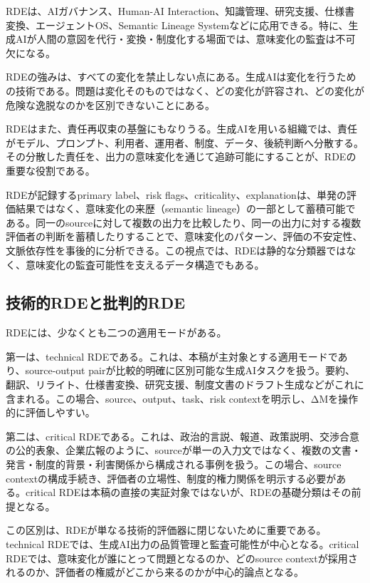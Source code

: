 \documentclass[
  a4paper]{ltjsarticle}
\begin{document}
RDEは、AIガバナンス、Human-AI
Interaction、知識管理、研究支援、仕様書変換、エージェントOS、Semantic
Lineage
Systemなどに応用できる。特に、生成AIが人間の意図を代行・変換・制度化する場面では、意味変化の監査は不可欠になる。

RDEの強みは、すべての変化を禁止しない点にある。生成AIは変化を行うための技術である。問題は変化そのものではなく、どの変化が許容され、どの変化が危険な逸脱なのかを区別できないことにある。

RDEはまた、責任再収束の基盤にもなりうる。生成AIを用いる組織では、責任がモデル、プロンプト、利用者、運用者、制度、データ、後続判断へ分散する。その分散した責任を、出力の意味変化を通じて追跡可能にすることが、RDEの重要な役割である。

RDEが記録するprimary label、risk
flags、criticality、explanationは、単発の評価結果ではなく、意味変化の来歴（semantic
lineage）の一部として蓄積可能である。同一のsourceに対して複数の出力を比較したり、同一の出力に対する複数評価者の判断を蓄積したりすることで、意味変化のパターン、評価の不安定性、文脈依存性を事後的に分析できる。この視点では、RDEは静的な分類器ではなく、意味変化の監査可能性を支えるデータ構造でもある。

\subsection{技術的RDEと批判的RDE}\label{technical-rde-and-critical-rde}

RDEには、少なくとも二つの適用モードがある。

第一は、technical
RDEである。これは、本稿が主対象とする適用モードであり、source-output
pairが比較的明確に区別可能な生成AIタスクを扱う。要約、翻訳、リライト、仕様書変換、研究支援、制度文書のドラフト生成などがこれに含まれる。この場合、source、output、task、risk
contextを明示し、ΔMを操作的に評価しやすい。

第二は、critical
RDEである。これは、政治的言説、報道、政策説明、交渉合意の公的表象、企業広報のように、sourceが単一の入力文ではなく、複数の文書・発言・制度的背景・利害関係から構成される事例を扱う。この場合、source
contextの構成手続き、評価者の立場性、制度的権力関係を明示する必要がある。critical
RDEは本稿の直接の実証対象ではないが、RDEの基礎分類はその前提となる。

この区別は、RDEが単なる技術的評価器に閉じないために重要である。technical
RDEでは、生成AI出力の品質管理と監査可能性が中心となる。critical
RDEでは、意味変化が誰にとって問題となるのか、どのsource
contextが採用されるのか、評価者の権威がどこから来るのかが中心的論点となる。
\end{document}
